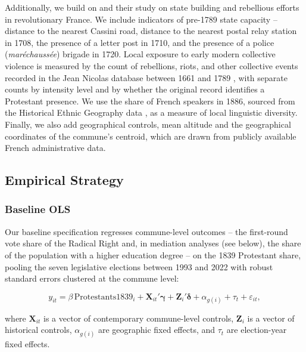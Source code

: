 \documentclass[12pt]{article}
\begin{document}
Additionally, we build on \textcite{albertusStateBuildingRebellionRunUp2025} and their study on state building and rebellious efforts in revolutionary France. We include indicators of pre-1789 state capacity -- distance to the nearest Cassini road, distance to the nearest postal relay station in 1708, the presence of a letter post in 1710, and the presence of a police (\textit{maréchaussée}) brigade in 1720. Local exposure to early modern collective violence is measured by the count of rebellions, riots, and other collective events recorded in the Jean Nicolas database between 1661 and 1789 \parencite{gayvictorJeanNicolasDatabase2025}, with separate counts by intensity level and by whether the original record identifies a Protestant presence. We use the share of French speakers in 1886, sourced from the Historical Ethnic Geography data \parencite{muller-creponRightPeoplingStateNationalism2025}, as a measure of local linguistic diversity. Finally, we also add geographical controls, mean altitude and the geographical coordinates of the commune's centroid, which are drawn from publicly available French administrative data.

\subsection{Empirical Strategy}

\subsubsection{Baseline OLS}

Our baseline specification regresses commune-level outcomes -- the first-round vote share of the Radical Right and, in mediation analyses (see below), the share of the population with a higher education degree -- on the 1839 Protestant share, pooling the seven legislative elections between 1993 and 2022 with robust standard errors clustered at the commune level:

\[
y_{it} = \beta\,\text{Protestants1839}_{i} + \mathbf{X}_{it}'\boldsymbol{\gamma} + \mathbf{Z}_{i}'\boldsymbol{\delta} + \alpha_{g(i)} + \tau_t + \varepsilon_{it},
\]

where $\mathbf{X}_{it}$ is a vector of contemporary commune-level controls, $\mathbf{Z}_i$ is a vector of historical controls, $\alpha_{g(i)}$ are geographic fixed effects, and $\tau_t$ are election-year fixed effects.
\end{document}
